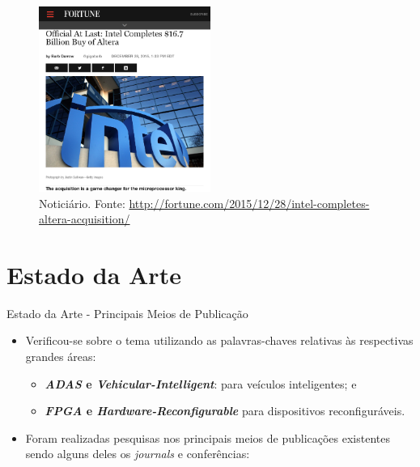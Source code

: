 \documentclass[aspectratio=169]{beamer}
\begin{document}
\begin{frame}
	\begin{figure}[H]
		\centering
		\includegraphics[width=0.5\textwidth]{img/intel_altera_2.png}
		\protect\caption{Noticiário. Fonte: \url{http://fortune.com/2015/12/28/intel-completes-altera-acquisition/}}
		\label{fig:intel_altera_noticia}
	\end{figure}
\end{frame}


\section{Estado da Arte}
\begin{frame}{Estado da Arte - Principais Meios de Publicação}
	\begin{itemize}
		\item Verificou-se sobre o tema utilizando as palavras-chaves relativas às respectivas grandes áreas: 
		\begin{itemize}
			\item \textbf{\textit{ADAS} e \textit{Vehicular-Intelligent}}: para veículos inteligentes; e \item \textbf{\textit{FPGA} e \textit{Hardware-Reconfigurable}} para dispositivos reconfiguráveis.
		\end{itemize} 
		
			\bigskip
		
		\item Foram realizadas pesquisas nos principais meios de publicações existentes sendo alguns deles os \textit{journals} e conferências:
	\end{itemize}
\end{frame}
\end{document}
